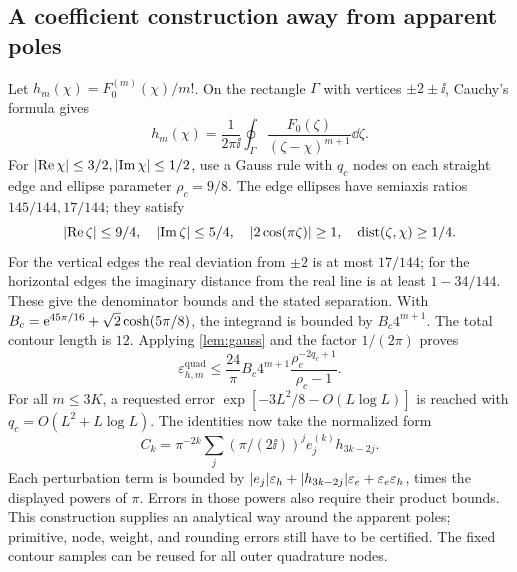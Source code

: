 \subsection{A coefficient construction away from apparent poles}
Let \(h_m(\chi)=F_0^{(m)}(\chi)/m!\).
On the rectangle \(\Gamma\) with vertices \(\pm2\pm\ii\),
Cauchy's formula gives
\begin{equation}
 h_m(\chi)=\frac1{2\pi\ii}\oint_\Gamma
                         \frac{F_0(\zeta)}{(\zeta-\chi)^{m+1}}\dd\zeta.
 \label{eq:contour-jet}
\end{equation}
For \(\lvert \operatorname{Re}\chi\rvert\le3/2,\lvert \operatorname{Im}\chi\rvert\le1/2\), use
a Gauss rule with \(q_c\) nodes on each straight edge and ellipse
parameter \(\rho_c=9/8\).
The edge ellipses have semiaxis ratios \(145/144,17/144\);
they satisfy
\[
 \lvert \operatorname{Re}\zeta\rvert\le9/4,\quad\lvert \operatorname{Im}\zeta\rvert\le5/4,\quad
 \lvert 2\cos(\pi\zeta)\rvert\ge1,\quad
 \operatorname{dist}(\zeta,\chi)\ge1/4.
\]
For the vertical edges the real deviation from \(\pm2\) is
at most \(17/144\); for the horizontal edges the imaginary
distance from the real line is at least \(1-34/144\).
These give the denominator bounds and the stated separation.
With \(B_c=\mathrm e^{45\pi/16}+\sqrt2\cosh(5\pi/8)\), the integrand
is bounded by \(B_c4^{m+1}\).
The total contour length is \(12\). Applying \cref{lem:gauss}
and the factor \(1/(2\pi)\) proves
\begin{equation}
 \varepsilon_{h,m}^{\mathrm{quad}}
 \le\frac{24}{\pi}B_c4^{m+1}
                  \frac{\rho_c^{-2q_c+1}}{\rho_c-1}.
 \label{eq:contour-error}
\end{equation}
For all \(m\le3K\), a requested error
\(\exp[-3L^2/8-O(L\log L)]\) is reached with
\(q_c=O(L^2+L\log L)\).
The identities now take the normalized form
\[
 C_k=\pi^{-2k}\sum_j(\pi/(2\ii))^j e_j^{(k)}h_{3k-2j}.
\]
Each perturbation term is bounded by
\(\lvert e_j\rvert\varepsilon_h+\lvert h_{3k-2j}\rvert\varepsilon_e+
\varepsilon_e\varepsilon_h\), times the displayed powers of \(\pi\).
Errors in those powers also require their product bounds.
This construction supplies an analytical way around the apparent
poles; primitive, node, weight, and rounding errors still have to
be certified. The fixed contour samples can be reused for all
outer quadrature nodes.


